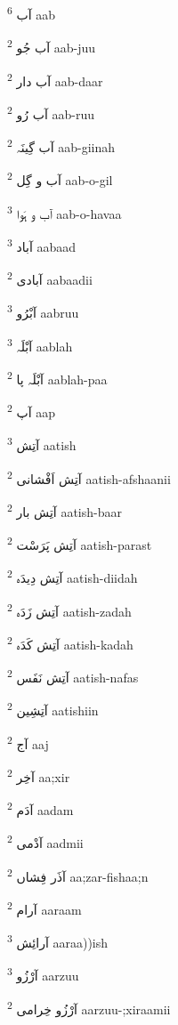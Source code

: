 \documentclass[12pt]{article}
\begin{document}
\begin{multicols}{5}
{\ur آب}   \textsuperscript{6} aab

{\ur آب جُو}   \textsuperscript{2} aab-juu

{\ur آب دار}   \textsuperscript{2} aab-daar

{\ur آب رُو}   \textsuperscript{2} aab-ruu

{\ur آب گِینَہ}   \textsuperscript{2} aab-giinah

{\ur آب و گِل}   \textsuperscript{2} aab-o-gil

{\ur آب و ہَوا}   \textsuperscript{3} aab-o-havaa

{\ur آباد}   \textsuperscript{3} aabaad

{\ur آبادی}   \textsuperscript{2} aabaadii

{\ur آبْرُو}   \textsuperscript{3} aabruu

{\ur آبْلَہ}   \textsuperscript{3} aablah

{\ur آبْلَہ پا}   \textsuperscript{2} aablah-paa

{\ur آپ}   \textsuperscript{2} aap

{\ur آتِش}   \textsuperscript{3} aatish

{\ur آتِش اَفْشانی}   \textsuperscript{2} aatish-afshaanii

{\ur آتِش بار}   \textsuperscript{2} aatish-baar

{\ur آتِش پَرَسْت}   \textsuperscript{2} aatish-parast

{\ur آتِش دِیدَہ}   \textsuperscript{2} aatish-diidah

{\ur آتِش زَدَہ}   \textsuperscript{2} aatish-zadah

{\ur آتِش کَدَہ}   \textsuperscript{2} aatish-kadah

{\ur آتِش نَفَس}   \textsuperscript{2} aatish-nafas

{\ur آتِشِین}   \textsuperscript{2} aatishiin

{\ur آج}   \textsuperscript{2} aaj

{\ur آخِر}   \textsuperscript{2} aa;xir

{\ur آدَم}   \textsuperscript{2} aadam

{\ur آدْمی}   \textsuperscript{2} aadmii

{\ur آذَر فِشاں}   \textsuperscript{2} aa;zar-fishaa;n

{\ur آرام}   \textsuperscript{2} aaraam

{\ur آرائِش}   \textsuperscript{3} aaraa))ish

{\ur آرْزُو}   \textsuperscript{3} aarzuu

{\ur آرْزُو خِرامی}   \textsuperscript{2} aarzuu-;xiraamii


\end{multicols}
\end{document}
